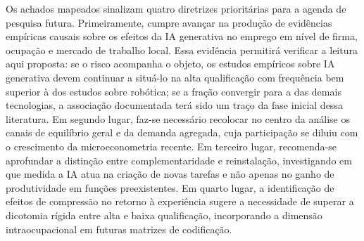 Os achados mapeados sinalizam quatro diretrizes prioritárias para a agenda de pesquisa futura. Primeiramente, cumpre avançar na produção de evidências empíricas causais sobre os efeitos da IA generativa no emprego em nível de firma, ocupação e mercado de trabalho local. Essa evidência permitirá verificar a leitura aqui proposta: se o risco acompanha o objeto, os estudos empíricos sobre IA generativa devem continuar a situá-lo na alta qualificação com frequência bem superior à dos estudos sobre robótica; se a fração convergir para a das demais tecnologias, a associação documentada terá sido um traço da fase inicial dessa literatura. Em segundo lugar, faz-se necessário recolocar no centro da análise os canais de equilíbrio geral e da demanda agregada, cuja participação se diluiu com o crescimento da microeconometria recente. Em terceiro lugar, recomenda-se aprofundar a distinção entre complementaridade e reinstalação, investigando em que medida a IA atua na criação de novas tarefas e não apenas no ganho de produtividade em funções preexistentes. Em quarto lugar, a identificação de efeitos de compressão no retorno à experiência sugere a necessidade de superar a dicotomia rígida entre alta e baixa qualificação, incorporando a dimensão intraocupacional em futuras matrizes de codificação.
